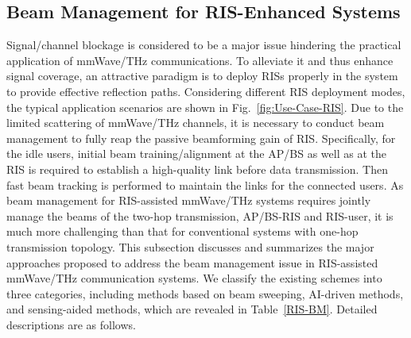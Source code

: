 \documentclass[journal,comsoc]{IEEEtran}
\begin{document}
\subsection{Beam Management for RIS-Enhanced Systems}
Signal/channel blockage is considered to be a major issue hindering the practical application of mmWave/THz communications. To alleviate it and thus enhance signal coverage, an attractive paradigm is to deploy RISs properly in the system to provide effective reflection paths. Considering different RIS deployment modes, the typical application scenarios are shown in Fig.~\ref{fig:Use-Case-RIS}. Due to the limited scattering of mmWave/THz channels, it is necessary to conduct beam management to fully reap the passive beamforming gain of RIS. Specifically, for the idle users, initial beam training/alignment at the AP/BS as well as at the RIS is required to establish a high-quality link before data transmission. Then fast beam tracking is performed to maintain the links for the connected users. As beam management for RIS-assisted mmWave/THz systems requires jointly manage the beams of the two-hop transmission, AP/BS-RIS and RIS-user, it is much more challenging than that for conventional systems with one-hop transmission topology. This subsection discusses and summarizes the major approaches proposed to address the beam management issue in RIS-assisted mmWave/THz communication systems. We classify the existing schemes into three categories, including methods based on beam sweeping, AI-driven methods, and sensing-aided methods, which are revealed in Table~\ref{RIS-BM}. Detailed descriptions are as follows.
\end{document}

